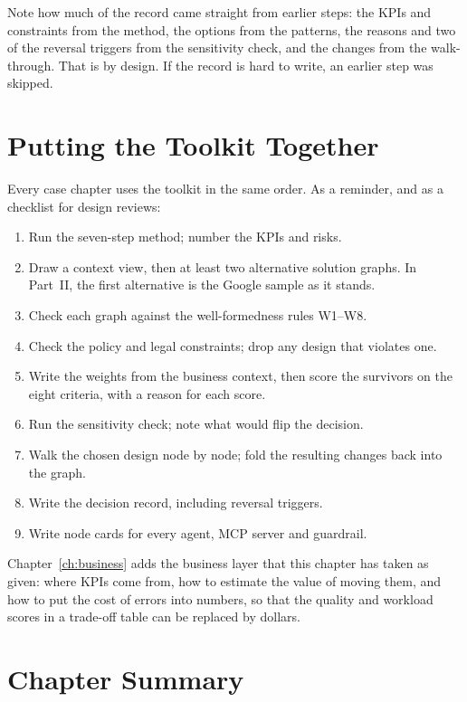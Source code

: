 Note how much of the record came straight from earlier steps: the KPIs and constraints from the method, the options from the patterns, the reasons and two of the reversal triggers from the sensitivity check, and the changes from the walk-through. That is by design. If the record is hard to write, an earlier step was skipped.

\section{Putting the Toolkit Together}
\label{sec:toolkit-together}

Every case chapter uses the toolkit in the same order. As a reminder, and as a checklist for design reviews:

\begin{enumerate}[itemsep=1pt]
  \item Run the seven-step method; number the KPIs and risks.
  \item Draw a context view, then at least two alternative solution graphs. In Part~II, the first alternative is the Google sample as it stands.
  \item Check each graph against the well-formedness rules W1--W8.
  \item Check the policy and legal constraints; drop any design that violates one.
  \item Write the weights from the business context, then score the survivors on the eight criteria, with a reason for each score.
  \item Run the sensitivity check; note what would flip the decision.
  \item Walk the chosen design node by node; fold the resulting changes back into the graph.
  \item Write the decision record, including reversal triggers.
  \item Write node cards for every agent, MCP server and guardrail.
\end{enumerate}

Chapter~\ref{ch:business} adds the business layer that this chapter has taken as given: where KPIs come from, how to estimate the value of moving them, and how to put the cost of errors into numbers, so that the quality and workload scores in a trade-off table can be replaced by dollars.

\section*{Chapter Summary}

